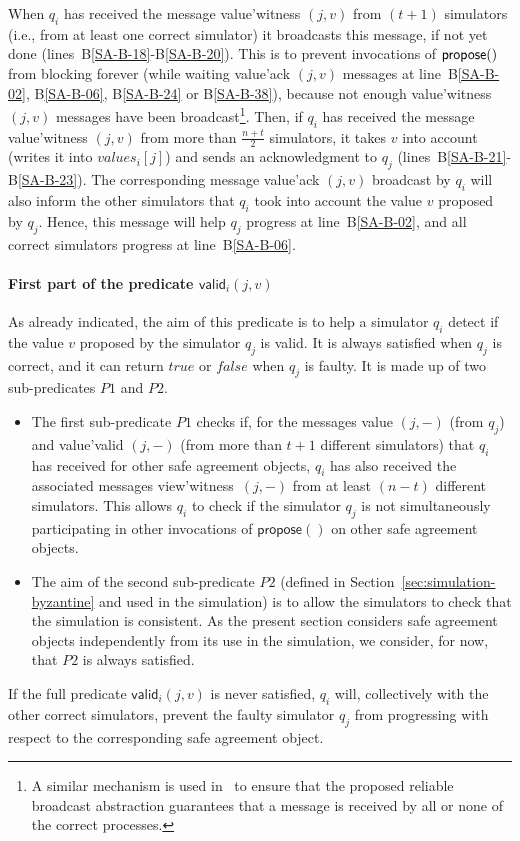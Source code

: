 \documentclass[11pt,letterpaper]{article}
\begin{document}
When $q_i$ has received the message {\sc value'witness} $(j,v)$
from $(t+1)$ simulators (i.e., from at least one correct simulator) it
broadcasts this message, if not yet done (lines~B\ref{SA-B-18}-B\ref{SA-B-20}).
This is to prevent  invocations of  ${\sf propose}()$
from blocking forever (while waiting {\sc value'ack} $(j,v)$
messages at line~B\ref{SA-B-02}, B\ref{SA-B-06}, B\ref{SA-B-24} or
B\ref{SA-B-38}),   because not enough {\sc value'witness} $(j,v)$ messages
have been broadcast\footnote{A similar mechanism is used in~\cite{B87}
to ensure that the proposed reliable broadcast abstraction guarantees
that a  message is received by all or none of the correct processes.}.
Then, if $q_i$  has received the message {\sc value'witness} $(j,v)$
from more than $\frac{n+t}{2}$ simulators,
it takes $v$ into account  (writes it into $values_i[j]$) and sends an
acknowledgment to $q_j$ (lines~B\ref{SA-B-21}-B\ref{SA-B-23}).
The corresponding message {\sc value'ack} $(j,v)$ broadcast by $q_i$
will  also inform the other simulators  that $q_i$ took  into account the
value  $v$   proposed by  $q_j$. Hence,  this message  will help  $q_j$
progress at line~B\ref{SA-B-02}, and all correct simulators  progress at
line~B\ref{SA-B-06}.




\paragraph{First part of the predicate $\mathsf{valid}_i(j,v)$}
\label{sec:def-is-valid}
As already indicated, the aim of this predicate is  to help a simulator $q_i$
detect if the value $v$ proposed by the simulator  $q_j$ is valid.
It is always satisfied when  $q_j$  is correct, and it can return 
${\mathit true}$  or ${\mathit false}$ when $q_j$ is faulty. 
It is made up of two sub-predicates $P1$ and $P2$.

\begin{itemize}
\vspace{-0.2cm}
\item
The first sub-predicate  $P1$
checks if, for the messages {\sc value} $(j,-)$ (from $q_j$) and 
{\sc value'valid} $(j,-)$ (from more than $t+1$ different simulators) 
that $q_i$ has  received for other safe agreement objects,  $q_i$ has also 
received the associated messages {\sc view'witness}~$(j,-)$ 
from at least $(n-t)$ different simulators.
This allows $q_i$ to check if the simulator $q_j$ is not
simultaneously  participating in other invocations of $\mathsf{propose}()$
on  other safe agreement  objects.
\vspace{-0.2cm}
\item
The aim of the second  sub-predicate $P2$ (defined in
Section~\ref{sec:simulation-byzantine} and used in the simulation) is 
to allow the simulators to check that the simulation is consistent.
As  the present section considers safe agreement objects independently 
from its use in the simulation, we consider, for now,
 that $P2$ is always satisfied.
\end{itemize}
If the full predicate $\mathsf{valid}_i(j,v)$ is never satisfied,  
$q_i$ will, collectively with the other correct simulators,
prevent the faulty simulator $q_j$ from progressing
with respect to the corresponding safe agreement object.
\end{document}
